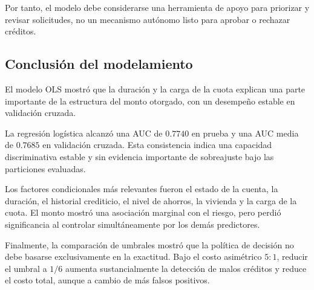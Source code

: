 Por tanto, el modelo debe considerarse una herramienta de apoyo para
priorizar y revisar solicitudes, no un mecanismo autónomo listo para
aprobar o rechazar créditos.

\subsection{Conclusión del modelamiento}

El modelo OLS mostró que la duración y la carga de la cuota explican una
parte importante de la estructura del monto otorgado, con un desempeño
estable en validación cruzada.

La regresión logística alcanzó una AUC de \(0.7740\) en prueba y una AUC
media de \(0.7685\) en validación cruzada. Esta consistencia indica una
capacidad discriminativa estable y sin evidencia importante de
sobreajuste bajo las particiones evaluadas.

Los factores condicionales más relevantes fueron el estado de la cuenta,
la duración, el historial crediticio, el nivel de ahorros, la vivienda y
la carga de la cuota. El monto mostró una asociación marginal con el
riesgo, pero perdió significancia al controlar simultáneamente por los
demás predictores.

Finalmente, la comparación de umbrales mostró que la política de decisión
no debe basarse exclusivamente en la exactitud. Bajo el costo asimétrico
\(5:1\), reducir el umbral a \(1/6\) aumenta sustancialmente la detección
de malos créditos y reduce el costo total, aunque a cambio de más falsos
positivos.


